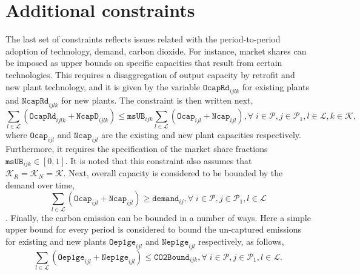 \documentclass{amsbook}
\begin{document}
\section{Additional constraints}
The last set of constraints reflects issues related with the period-to-period
adoption of technology, demand, carbon dioxide.  For instance, market shares can
be imposed as upper bounds on specific capacities that result from certain
technologies. This requires a disaggregation of output capacity by retrofit and
new plant technology, and it is given by the variable $\mathtt{OcapRd}_{ijlk}$
for existing plants and $\mathtt{NcapRd}_{ijlk}$ for new plants. The constraint
is then written next,
\begin{equation}
    \sum_{l\in\mathcal{L}} 
    \left(\mathtt{OcapRd}_{ijlk} + \mathtt{NcapD}_{ijlk}\right)
    \leq \mathtt{msUB}_{ijk}
    \sum_{l\in\mathcal{L}} 
    \left(\mathtt{Ocap}_{ijl} + \mathtt{Ncap}_{ijl} \right),
    \forall \; i \in \mathcal{P},j \in \mathcal{P}_1 , l \in \mathcal{L}, k \in
    \mathcal{K},
\end{equation}
%
where $\mathtt{Ocap}_{ijl}$ and $\mathtt{Ncap}_{ijl}$ are the existing and new
plant capacities respectively. Furthermore, it requires the specification of the
market share fractions $\mathtt{msUB}_{ijk}\in \left[0, 1\right]$. It is noted
that this constraint also assumes that $\mathcal{K}_R=\mathcal{K}_N=\mathcal{K}$.
Next, overall capacity is considered to be bounded by the demand over time,
\begin{equation}
    \sum_{l\in\mathcal{L}}
    \left(\mathtt{Ocap}_{ijl} + \mathtt{Ncap}_{ijl}\right) 
    \geq \mathtt{demand}_{ij},
    \forall \; i \in \mathcal{P},j \in \mathcal{P}_1 , l \in \mathcal{L}
\end{equation}.
%
Finally, the carbon emission can be bounded in a number of ways. Here a simple
upper bound for every period is considered to bound the un-captured emissions for
existing and new plants $\mathtt{Oep1ge}_{ijl}$ and $\mathtt{Nep1ge}_{ijl}$
respectively, as follows,
\begin{equation}
    \sum_{l\in\mathcal{L}} 
    \left(\mathtt{Oep1ge}_{ijl} + \mathtt{Nep1ge}_{ijl}\right) \leq 
    \mathtt{CO2Bound}_{ijk},
    \forall \; i \in \mathcal{P},j \in \mathcal{P}_1 , l \in \mathcal{L}.
\end{equation}

%
\end{document}
